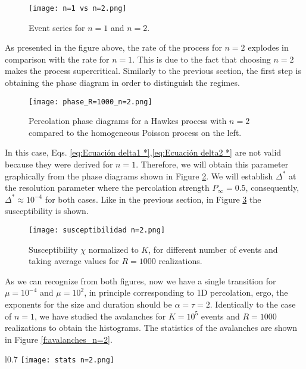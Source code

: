 \begin{figure}[H]
    \centering
    \texttt{[image: n=1 vs n=2.png]}
    \caption{Event series for $n=1$ and $n=2$.}
    \label{f:n=1 vs n=2}
\end{figure}

As presented in the figure above, the rate of the process for $n=2$ explodes in comparison with the rate for $n=1$. This is due to the fact that choosing $n=2$ makes the process supercritical.
Similarly to the previous section, the first step is obtaining the phase diagram in order to distinguish the regimes. 

\begin{figure}[H]
    \centering
    \texttt{[image: phase\_R=1000\_n=2.png]}
    \caption{Percolation phase diagrams for a Hawkes process with $n=2$ compared to the homogeneous Poisson process on the left.}
    \label{f:phase_diagram_n=2}
\end{figure}
In this case, Eqs. \ref{eq:Ecuación delta1 *},\ref{eq:Ecuación delta2 *} are not valid because they were derived for $n=1$. 
Therefore, we will obtain this parameter graphically from the phase diagrams shown in Figure \ref{f:phase_diagram_n=2}. We will establish $\Delta^*$ at the resolution parameter where the
percolation strength $P_{\infty} = 0.5$, consequently, $\Delta^*\approx 10^{-4}$ for both cases. Like in the previous section, in Figure \ref{f:susceptibilidad_n=2} the susceptibility is shown.

\begin{figure}[H]
    \centering
    \texttt{[image: susceptibilidad n=2.png]}
    \caption{Susceptibility $\chi$ normalized to $K$, for different number of events and taking average values for $R=1000$ realizations.}
    \label{f:susceptibilidad_n=2}
\end{figure}


As we can recognize from both figures, now we have a single transition for $\mu=10^{-4}$ and $\mu=10^2$, in principle corresponding to 1D percolation, ergo, 
the exponents for the size and duration should be $\alpha=\tau=2$. Identically to the case of $n=1$, we have studied the avalanches for $K=10^5$ events and $R=1000$ realizations to 
obtain the histograms. The statistics of the avalanches are shown in Figure \ref{f:avalanches_n=2}.

\begin{wrapfigure}{l}{0.7\textwidth}
      \texttt{[image: stats n=2.png]}
    \caption{Avalanche statistics for a self-exciting Hawkes process with $n=2$ for $K=10^5$ events. The histograms have been calculated over $R=1000$ time series.}
    \label{f:avalanches_n=2}
\end{wrapfigure}

